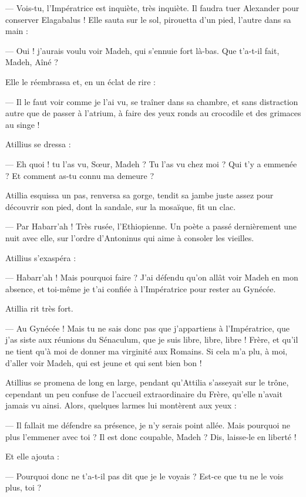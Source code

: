\documentclass[a4paper, 11pt, oneside, polutonikogreek, french]{article}
\begin{document}
--- Vois-tu, l'Impératrice est inquiète, très inquiète. Il faudra tuer Alexander pour conserver Elagabalus !
Elle sauta sur le sol, pirouetta d'un pied, l'autre dans sa main :

--- Oui ! j'aurais voulu voir Madeh, qui s'ennuie fort là-bas. Que t'a-t-il fait, Madeh, Aîné ?

Elle le réembrassa et, en un éclat de rire :

--- Il le faut voir comme je l'ai vu, se traîner dans sa chambre, et sans distraction autre que de passer à l'atrium, à faire des yeux ronds au crocodile et des grimaces au singe !

Atillius se dressa :

--- Eh quoi ! tu l'as vu, Sœur, Madeh ? Tu l'as vu chez moi ? Qui t'y a emmenée ? Et comment as-tu connu ma demeure ?

Atillia esquissa un pas, renversa sa gorge, tendit sa jambe juste assez pour découvrir son pied, dont la sandale, sur la mosaïque, fit un clac.

--- Par Habarr’ah ! Très rusée, l'Ethiopienne. Un poète a passé dernièrement une nuit avec elle, sur l'ordre d'Antoninus qui aime à consoler les vieilles.

Atillius s'exaspéra :

--- Habarr'ah ! Mais pourquoi faire ? J'ai défendu qu'on allât voir Madeh en mon absence, et toi-même je t'ai confiée à l'Impératrice pour rester au Gynécée.

Atillia rit très fort.

--- Au Gynécée ! Mais tu ne sais donc pas que j'appartiens à l'Impératrice, que j'as siste aux réunions du Sénaculum, que je suis libre, libre, libre ! Frère, et qu'il ne tient qu'à moi de donner ma virginité aux Romains. Si cela m'a plu, à moi, d'aller voir Madeh, qui est jeune et qui sent bien bon !

Atillius se promena de long en large, pendant qu'Attilia s'asseyait sur le trône, cependant un peu confuse de l'accueil extraordinaire du Frère, qu'elle n'avait jamais vu ainsi. Alors, quelques larmes lui montèrent aux yeux :

--- Il fallait me défendre sa présence, je n'y serais point allée. Mais pourquoi ne plus l'emmener avec toi ? Il est donc coupable, Madeh ? Dis, laisse-le en liberté !

Et elle ajouta :

--- Pourquoi donc ne t'a-t-il pas dit que je le voyais ? Est-ce que tu ne le vois plus, toi ?
\end{document}
